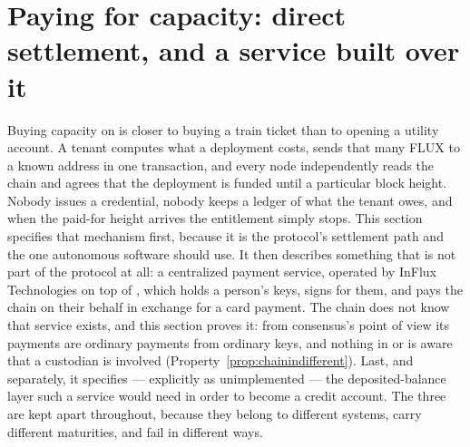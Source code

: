\section{Paying for capacity: direct settlement, and a service built over it}
\label{sec:paying-for-capacity}

Buying capacity on \Flux is closer to buying a train ticket than to opening a utility account. A
tenant computes what a deployment costs, sends that many FLUX to a known address in one transaction,
and every node independently reads the chain and agrees that the deployment is funded until a
particular block height. Nobody issues a credential, nobody keeps a ledger of what the tenant owes,
and when the paid-for height arrives the entitlement simply stops. This section specifies that
mechanism first, because it is the protocol's settlement path and the one autonomous software should
use. It then describes something that is not part of the protocol at all: a centralized payment
service, operated by InFlux Technologies on top of \Flux
{}, which holds a person's keys, signs for them, and pays the
chain on their behalf in exchange for a card payment. The chain does not know that service exists,
and this section proves it: from consensus's point of view its payments are ordinary payments from
ordinary keys, and nothing in \fluxd or \FluxOS is aware that a custodian is involved
(Property~\ref{prop:chainindifferent}). Last, and separately, it specifies --- explicitly as unimplemented --- the deposited-balance layer
such a service would need in order to become a credit account. The three are kept apart throughout,
because they belong to different systems, carry different maturities, and fail in different ways.

